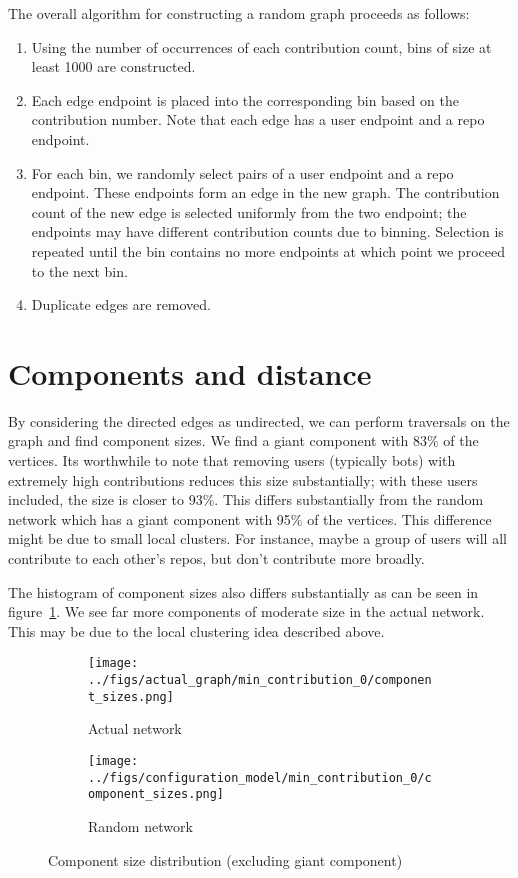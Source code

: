 \documentclass{pset}
\begin{document}
The overall algorithm for constructing a random graph proceeds as follows:
\begin{enumerate}
  \item Using the number of occurrences of each contribution count, bins of size
      at least 1000 are constructed. 
  \item Each edge endpoint is placed into the corresponding bin based on the
      contribution number. Note that each edge has a user endpoint and a repo
      endpoint.
  \item For each bin, we randomly select pairs of a user endpoint and a repo
      endpoint.  These endpoints form an edge in the new graph.  The
      contribution count of the new edge is selected uniformly from the two
      endpoint; the endpoints may have different contribution counts due to
      binning.  Selection is repeated until the bin contains no more endpoints
      at which point we proceed to the next bin.
  \item Duplicate edges are removed.
\end{enumerate}

\section*{Components and distance}

By considering the directed edges as undirected, we can perform traversals
on the graph and find component sizes.
We find a giant component with 83\% of the vertices. 
Its worthwhile to note that removing users (typically bots) with extremely high
contributions reduces this size substantially; with these users included,
the size is closer to 93\%.
This differs substantially from
the random network which has a giant component with 95\% of the vertices.
This difference might be due to small local clusters. For instance, maybe a
group of users will all contribute to each other's repos, but don't contribute
more broadly. 

The histogram of component sizes also differs substantially
as can be seen in figure~\ref{fig:components hist}.
We see far more components of moderate size in the actual network.
This may be due to the local clustering idea described above.

\begin{figure}[ht]
\centering
\begin{subfigure}{.5\textwidth}
  \centering
  \texttt{[image: ../figs/actual\_graph/min\_contribution\_0/component\_sizes.png]}
    \caption{Actual network}
\end{subfigure}%
\begin{subfigure}{.5\textwidth}
  \centering
  \texttt{[image: ../figs/configuration\_model/min\_contribution\_0/component\_sizes.png]}
    \caption{Random network}
\end{subfigure}%
\caption{Component size distribution (excluding giant component)}\label{fig:components hist}
\end{figure}
\end{document}
